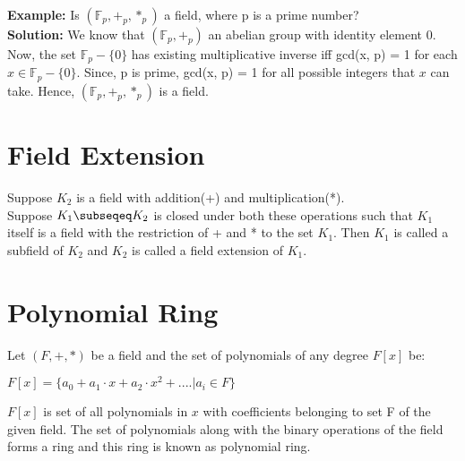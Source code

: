 \documentclass[11pt]{article}
\begin{document}
\textbf{Example:} Is $(\mathbb{F}_p, +_p, *_p)$ a field, where p is a prime number?\\
\textbf{Solution:} We know that $(\mathbb{F}_p, +_p)$ an abelian group with identity element 0. Now, the set $\mathbb{F}_p - \{0\}$ has existing multiplicative inverse iff gcd(x, p) = 1 for each $x \in \mathbb{F}_p - \{0\}$. Since, p is prime, gcd(x, p) = 1 for all possible integers that $x$ can take. Hence, $(\mathbb{F}_p, +_p, *_p)$ is a field.\\



\section{Field Extension}
Suppose $K_2$ is a field with addition(+) and multiplication(*). \\
Suppose $K_1 \subseqeq K_2$ is closed under both these operations such that $K_1$ itself is a field with the restriction of + and * to the set $K_1$. Then $K_1$ is called a subfield of $K_2$ and $K_2$ is called a field extension of $K_1$.

\section{Polynomial Ring}
Let $(F, +, *)$ be a field and the set of polynomials of any degree $F[x]$ be:
\begin{center}
    $F[x] = \{a_0 + a_1\cdot x + a_2 \cdot x^2 +.... | a_i \in F\}$
\end{center}
$F[x]$ is set of all polynomials in $x$ with coefficients belonging to set F of the given field. The set of polynomials along with the binary operations of the field forms a ring and this ring is known as polynomial ring.
\end{document}
